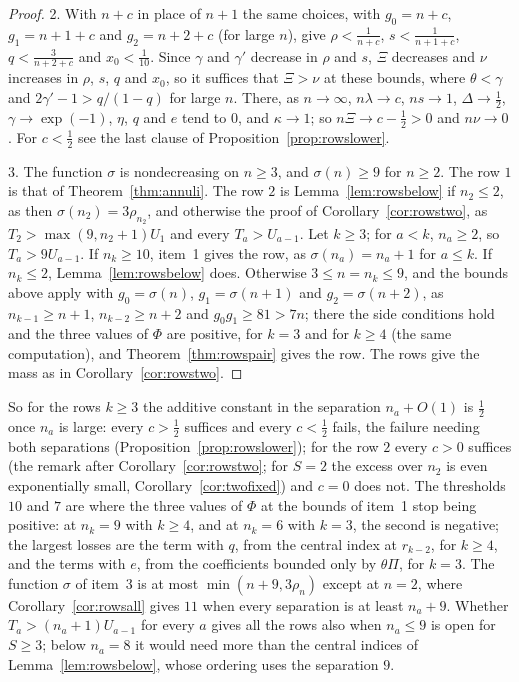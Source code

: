 \documentclass[11pt]{article}
\begin{document}
\begin{proof}
2.  With $n+c$ in place of $n+1$ the same choices, with $g_0=n+c$,
$g_1=n+1+c$ and $g_2=n+2+c$ (for large $n$), give $\rho<\frac1{n+c}$,
$s<\frac1{n+1+c}$, $q<\frac3{n+2+c}$ and $x_0<\frac1{10}$.
Since $\gamma$ and $\gamma'$ decrease in $\rho$ and $s$, $\Xi$ decreases and
$\nu$ increases in $\rho$, $s$, $q$ and $x_0$, so it suffices that $\Xi>\nu$
at these bounds, where $\theta<\gamma$ and $2\gamma'-1>q/(1-q)$ for large
$n$.  There, as $n\to\infty$, $n\lambda\to c$, $ns\to1$,
$\Delta\to\frac12$, $\gamma\to\exp(-1)$, $\eta$, $q$ and $e$ tend to $0$,
and $\kappa\to1$; so $n\Xi\to c-\frac12>0$ and $n\nu\to0$.  For $c<\frac12$
see the last clause of Proposition~\ref{prop:rowslower}.

3.  The function $\sigma$ is nondecreasing on $n\ge3$, and $\sigma(n)\ge9$
for $n\ge2$.  The row $1$ is that of Theorem~\ref{thm:annuli}.  The row $2$
is Lemma~\ref{lem:rowsbelow} if $n_2\le2$, as then
$\sigma(n_2)=3\rho_{n_2}$, and otherwise the proof of
Corollary~\ref{cor:rowstwo}, as $T_2>\max(9,n_2+1)U_1$ and every
$T_a>U_{a-1}$.  Let $k\ge3$; for $a<k$, $n_a\ge2$, so $T_a>9U_{a-1}$.  If
$n_k\ge10$, item~1 gives the row, as $\sigma(n_a)=n_a+1$ for $a\le k$.  If
$n_k\le2$, Lemma~\ref{lem:rowsbelow} does.  Otherwise $3\le n=n_k\le9$, and
the bounds above apply with $g_0=\sigma(n)$, $g_1=\sigma(n+1)$ and
$g_2=\sigma(n+2)$, as $n_{k-1}\ge n+1$, $n_{k-2}\ge n+2$ and
$g_0g_1\ge81>7n$; there the side conditions hold and the three values of
$\Phi$ are positive, for $k=3$ and for $k\ge4$ (the same computation), and
Theorem~\ref{thm:rowspair} gives the row.  The rows give the mass as in
Corollary~\ref{cor:rowstwo}.
\end{proof}

So for the rows $k\ge3$ the additive constant in the separation $n_a+O(1)$
is $\frac12$ once $n_a$ is large: every $c>\frac12$ suffices and every
$c<\frac12$ fails, the failure needing both separations
(Proposition~\ref{prop:rowslower}); for the row $2$ every $c>0$ suffices
(the remark after Corollary~\ref{cor:rowstwo}; for $S=2$ the excess over
$n_2$ is even exponentially small, Corollary~\ref{cor:twofixed}) and $c=0$
does not.  The thresholds $10$ and $7$ are where the three values of $\Phi$
at the bounds of item~1 stop being positive: at $n_k=9$ with $k\ge4$, and
at $n_k=6$ with $k=3$, the second is negative; the largest losses are the
term with $q$, from the central index at $r_{k-2}$, for $k\ge4$, and the
terms with $e$, from the coefficients bounded only by $\theta\Pi$, for
$k=3$.  The function $\sigma$ of item~3 is at most
$\min(n+9,3\rho_n)$ except at $n=2$, where Corollary~\ref{cor:rowsall}
gives $11$ when every separation is at least $n_a+9$.  Whether
$T_a>(n_a+1)U_{a-1}$ for every $a$ gives all the rows also when $n_a\le9$
is open for $S\ge3$; below $n_a=8$ it would need more than the central
indices of Lemma~\ref{lem:rowsbelow}, whose ordering uses the separation
$9$.
\end{document}
